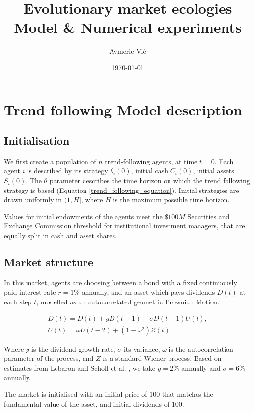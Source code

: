 \documentclass{article}
\title{Evolutionary market ecologies \\ Model \& Numerical experiments}
\author{Aymeric Vi\'{e}}
\date{\today}
\begin{document}
\maketitle

\tableofcontents

\clearpage

\section{Trend following Model description}

\subsection{Initialisation}

We first create a population of $n$ trend-following agents, at time $t=0$. Each agent $i$ is described by its strategy $\theta_i(0)$, initial cash $C_i(0)$, initial assets $S_i(0)$. The $\theta$ parameter describes the time horizon on which the trend following strategy is based (Equation \ref{trend_following_equation}). Initial strategies are drawn uniformly in $(1,H]$, where $H$ is the maximum possible time horizon. \par
Values for initial endowments of the agents meet the $\$100M$ Securities and Exchange Commission threshold for institutional investment managers, that are equally split in cash and asset shares. 

\subsection{Market structure}

In this market, agents are choosing between a bond with a fixed continuously paid interest rate $r = 1\%$ annually, and an asset which pays dividends $D(t)$ at each step $t$, modelled as an autocorrelated geometric Brownian Motion.

\begin{equation}
    \label{dividend_equation}
    \begin{array}{l}
{D}(t)={D}(t)+g {D}(t-1)+\sigma {D}(t-1) {U}(t), \\
{U}(t)=\omega U(t-2)+\left(1-\omega^{2}\right){Z}(t)
\end{array}
\end{equation}

Where $g$ is the dividend growth rate, $\sigma$ its variance, $\omega$ is the autocorrelation parameter of the process, and $Z$ is a standard Wiener process. Based on estimates from Lebaron \cite{lebaron2001empirical} and Scholl et al. \cite{scholl2020market}, we take $g=2\%$ annually and $\sigma = 6\%$ annually. \par
The market is initialised with an initial price of $100$ that matches the fundamental value of the asset, and initial dividends of $100$. 
\end{document}
